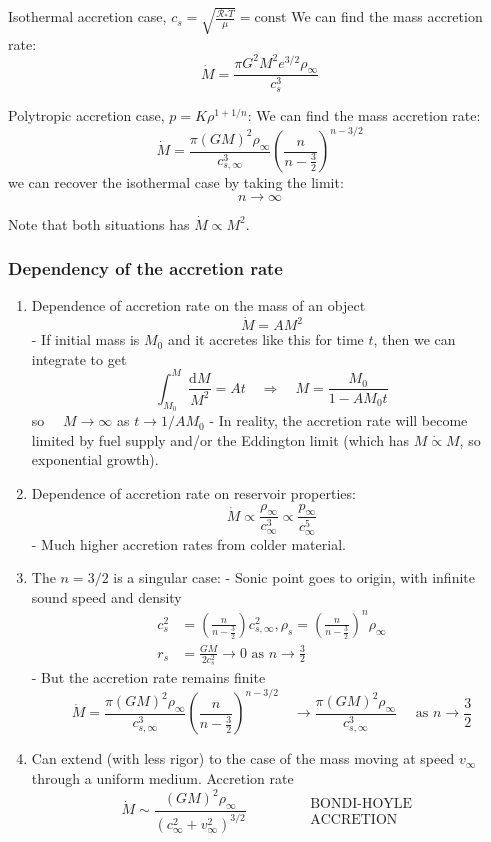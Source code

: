 \documentclass[12pt,a4paper]{article}
\begin{document}
\begin{example}
    {Isothermal accretion case, $c_s=\sqrt{\frac{\mathcal{R}_* T}{\mu}}=\mathrm{const}$}
    {We can find the mass accretion rate:
    $$
    \dot{M}=\frac{\pi G^2 M^2 e^{3 / 2} \rho_{\infty}}{c_s^3}
    $$
    }
\end{example}

\begin{example}
    {Polytropic accretion case, $p=K \rho^{1+1 / n}$: }{
        We can find the mass accretion rate:
        $$
        \dot{M}=\frac{\pi(G M)^2 \rho_{\infty}}{c_{s, \infty}^3}\left(\frac{n}{n-\frac{3}{2}}\right)^{n-3 / 2}
        $$
        we can recover the isothermal case by taking the limit:
        $$
        n \rightarrow \infty
        $$
    }
\end{example}
Note that both situations has $\dot{M} \propto M^2$.
\subsubsection{Dependency of the accretion rate}
\begin{enumerate}
    \item Dependence of accretion rate on the mass of an object
    $$
    \dot{M}=A M^2
    $$
    - If initial mass is $M_0$ and it accretes like this for time $t$, then we can integrate to get
    $$
    \int_{M_0}^M \frac{\mathrm{d} M}{M^2}=A t \quad \Rightarrow \quad M=\frac{M_0}{1-A M_0 t}
    $$
    so $\quad M \rightarrow \infty$ as $t \rightarrow 1 / A M_0$
    - In reality, the accretion rate will become limited by fuel supply and/or the Eddington limit (which has $M \dot{\propto} M$, so exponential growth).
    \item Dependence of accretion rate on reservoir properties:
    $$
    \dot{M} \propto \frac{\rho_{\infty}}{c_{\infty}^3} \propto \frac{p_{\infty}}{c_{\infty}^5}
    $$
    - Much higher accretion rates from colder material.
    \item The $n=3 / 2$ is a singular case:
    - Sonic point goes to origin, with infinite sound speed and density
    $$
    \begin{aligned}
    c_s^2 & =\left(\frac{n}{n-\frac{3}{2}}\right) c_{s, \infty}^2, \rho_s=\left(\frac{n}{n-\frac{3}{2}}\right)^n \rho_{\infty} \\
    r_s & =\frac{G M}{2 c_s^2} \rightarrow 0 \text { as } n \rightarrow \frac{3}{2}
    \end{aligned}
    $$
    - But the accretion rate remains finite
    $$
    \dot{M}=\frac{\pi(G M)^2 \rho_{\infty}}{c_{s, \infty}^3}\left(\frac{n}{n-\frac{3}{2}}\right)^{n-3 / 2} \quad \rightarrow \frac{\pi(G M)^2 \rho_{\infty}}{c_{s, \infty}^3} \quad \text { as } n \rightarrow \frac{3}{2}
    $$
    \item Can extend (with less rigor) to the case of the mass moving at speed $v_{\infty}$ through a uniform medium. Accretion rate
    $$
    \dot{M} \sim \frac{(G M)^2 \rho_{\infty}}{\left(c_{\infty}^2+v_{\infty}^2\right)^{3 / 2}} \quad \quad \quad \begin{aligned}
    & \text { BONDI-HOYLE } \\
    & \text { ACCRETION }
    \end{aligned}
    $$
\end{enumerate}
\end{document}
